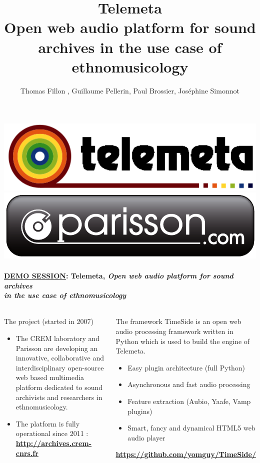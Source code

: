 \documentclass[final, hyperref, table]{beamer} \mode<presentation>
\title[TELEMETA, audio web CMS for Ethnomusicological
archives]{Telemeta\\Open web audio platform for sound archives in the
  use case of ethnomusicology}
\author[Fillon, Pellerin, Brossier, Simonnot]{Thomas Fillon
  \inst{1,2}, Guillaume Pellerin\inst{1}, Paul Brossier\inst{1},
  Jos{\'e}phine Simonnot\inst{3}}
\begin{document}
\setlength{\leftmargini}{10pt} \thispagestyle{empty}
\begin{frame}\tiny
  \frametitle{\includegraphics[width=0.3\linewidth]{logo_telemeta_alpha_black.png}
    \hspace{.4\linewidth} \includegraphics[width=.3\linewidth]{../poster/img/parisson_logo_FINALE_com.pdf}}
  \framesubtitle{{\underline{DEMO SESSION}}: \textbf{Telemeta, \emph{Open web audio platform for sound archives}\\
      \hspace{2.7cm}\emph{in the use case of ethnomusicology}}}
  \vspace{-0.2cm}
  \begin{columns}

    \column[t]{5.3cm}

    \begin{block}{The project {\tiny(started in 2007)}}
      \begin{itemize}
      \item The CREM laboratory and Parisson are developing an
        innovative, collaborative and interdisciplinary
        \alert{open-source web based multimedia platform} dedicated to
        \alert{sound archivists} and \alert{researchers in
          ethnomusicology}.
      \item The platform is fully operational since 2011 :
        \colorbox{yellow!50} {\bf \url{http://archives.crem-cnrs.fr}}
      \end{itemize}
    \end{block}
    \vspace{-0.2cm}
    \begin{block}{The framework}
      TimeSide is an open web audio processing framework written in
      Python which is used to build the engine of Telemeta.
      \begin{itemize}
      \item Easy plugin architecture (full Python)
      \item Asynchronous and fast audio processing
      \item Feature extraction (Aubio, Yaafe, Vamp plugins)
      \item Smart, fancy and dynamical HTML5 web audio player
      \end{itemize}
      \vspace{-0.5cm}
      \begin{center}
        \colorbox{yellow!50}{\bf
          \url{https://github.com/yomguy/TimeSide/}}
      \end{center}


\end{block}
\end{columns}
\end{frame}
\end{document}

